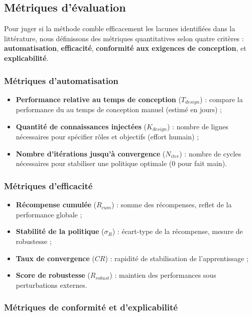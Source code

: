 \subsection{Métriques d'évaluation}

Pour juger si la méthode  comble efficacement les lacunes identifiées dans la littérature, nous définissons des métriques quantitatives selon quatre critères : \textbf{automatisation}, \textbf{efficacité}, \textbf{conformité aux exigences de conception}, et \textbf{explicabilité}.

\subsubsection{Métriques d'automatisation}

\begin{itemize}
    \item \textbf{Performance relative au temps de conception} ($T_{design}$) : compare la performance du  au temps de conception manuel (estimé en jours) ;
    \item \textbf{Quantité de connaissances injectées} ($K_{design}$) : nombre de lignes nécessaires pour spécifier rôles et objectifs (effort humain) ;
    \item \textbf{Nombre d'itérations jusqu'à convergence} ($N_{iter}$) : nombre de cycles nécessaires pour stabiliser une politique optimale (0 pour  fait main).
\end{itemize}

\subsubsection{Métriques d'efficacité}

\begin{itemize}
    \item \textbf{Récompense cumulée} ($R_{cum}$) : somme des récompenses, reflet de la performance globale ;
    \item \textbf{Stabilité de la politique} ($\sigma_R$) : écart-type de la récompense, mesure de robustesse ;
    \item \textbf{Taux de convergence} ($CR$) : rapidité de stabilisation de l'apprentissage ;
    \item \textbf{Score de robustesse} ($R_{robust}$) : maintien des performances sous perturbations externes.
\end{itemize}

\subsubsection{Métriques de conformité et d'explicabilité}

